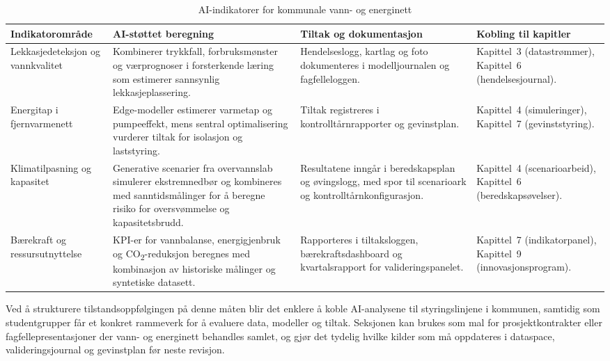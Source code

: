 \begin{table}[htbp]
    \centering
    \caption{AI-indikatorer for kommunale vann- og energinett}
    \label{tab:indikatorer-vann-energi}
    \begin{tabular}{p{3.6cm}p{4.0cm}p{4.2cm}p{3.8cm}}
        \toprule
        \textbf{Indikatorområde} & \textbf{AI-støttet beregning} & \textbf{Tiltak og dokumentasjon} & \textbf{Kobling til kapitler} \\
        \midrule
        Lekkasjedeteksjon og vannkvalitet & Kombinerer trykkfall, forbruksmønster og værprognoser i forsterkende læring som estimerer sannsynlig lekkasjeplassering. & Hendelseslogg, kartlag og foto dokumenteres i modelljournalen og fagfelleloggen. & Kapittel~3 (datastrømmer), Kapittel~6 (hendelsesjournal). \\
        \addlinespace
        Energitap i fjernvarmenett & Edge-modeller estimerer varmetap og pumpeeffekt, mens sentral optimalisering vurderer tiltak for isolasjon og laststyring. & Tiltak registreres i kontrolltårnrapporter og gevinstplan. & Kapittel~4 (simuleringer), Kapittel~7 (gevinststyring). \\
        \addlinespace
        Klimatilpasning og kapasitet & Generative scenarier fra overvannslab simulerer ekstremnedbør og kombineres med sanntidsmålinger for å beregne risiko for oversvømmelse og kapasitetsbrudd. & Resultatene inngår i beredskapsplan og øvingslogg, med spor til scenarioark og kontrolltårnkonfigurasjon. & Kapittel~4 (scenarioarbeid), Kapittel~6 (beredskapsøvelser). \\
        \addlinespace
        Bærekraft og ressursutnyttelse & KPI-er for vannbalanse, energigjenbruk og CO\textsubscript{2}-reduksjon beregnes med kombinasjon av historiske målinger og syntetiske datasett. & Rapporteres i tiltaksloggen, bærekraftsdashboard og kvartalsrapport for valideringspanelet. & Kapittel~7 (indikatorpanel), Kapittel~9 (innovasjonsprogram). \\
        \bottomrule
    \end{tabular}
\end{table}

Ved å strukturere tilstandsoppfølgingen på denne måten blir det enklere å koble AI-analysene til styringslinjene i kommunen, samtidig som studentgrupper får et konkret rammeverk for å evaluere data, modeller og tiltak. Seksjonen kan brukes som mal for prosjektkontrakter eller fagfellepresentasjoner der vann- og energinett behandles samlet, og gjør det tydelig hvilke kilder som må oppdateres i dataspace, valideringsjournal og gevinstplan før neste revisjon.

